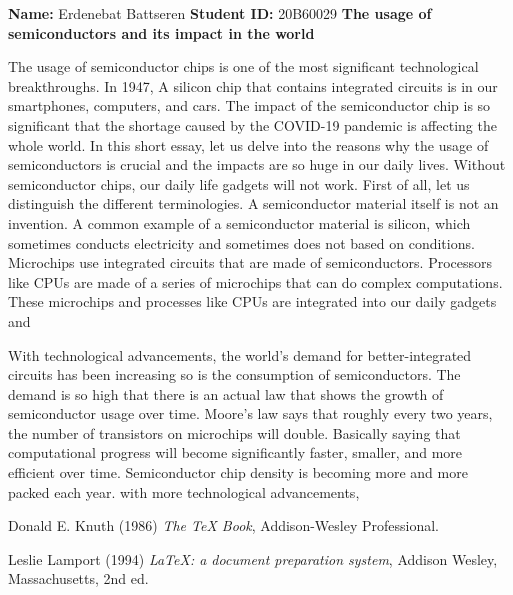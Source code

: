 \documentclass{article} %
\begin{document}

\begin{large}
\noindent
\textbf{Name:} Erdenebat Battseren \: \textbf{Student ID:} 20B60029
\newline
\textbf{The usage of semiconductors and its impact in the world}
\end{large}  
\vspace{0.2 cm}
\noindent
\newline
The usage of semiconductor chips is one of the most significant technological breakthroughs. In 1947, A silicon chip that contains integrated circuits is in our smartphones, computers, and cars. The impact of the semiconductor chip is so significant that the shortage caused by the COVID-19 pandemic is affecting the whole world. In this short essay, let us delve into the reasons why the usage of semiconductors is crucial and the impacts are so huge in our daily lives. 
\vspace{0.2 cm}
\newline
Without semiconductor chips, our daily life gadgets will not work. First of all, let us distinguish the different terminologies. A semiconductor material itself is not an invention. A common example of a semiconductor material is silicon, which sometimes conducts electricity and sometimes does not based on conditions. Microchips use integrated circuits that are made of semiconductors. Processors like CPUs are made of a series of microchips that can do complex computations. These microchips and processes like CPUs are integrated into our daily gadgets and


\vspace{0.2 cm}
\newline
With technological advancements, the world's demand for better-integrated circuits has been increasing so is the consumption of semiconductors. The demand is so high that there is an actual law that shows the growth of semiconductor usage over time. Moore's law says that roughly every two years, the number of transistors on microchips will double. Basically saying that computational progress will become significantly faster, smaller, and more efficient over time.
\vspace{0.2 cm}
\newline
Semiconductor chip density is becoming more and more packed each year. with more technological advancements, 
    
\begin{thebibliography}{9}
    Donald E. Knuth (1986) \emph{The \TeX{} Book}, Addison-Wesley Professional.
    
    Leslie Lamport (1994) \emph{\LaTeX: a document preparation system}, Addison
    Wesley, Massachusetts, 2nd ed.
    \end{thebibliography}
\end{document}
